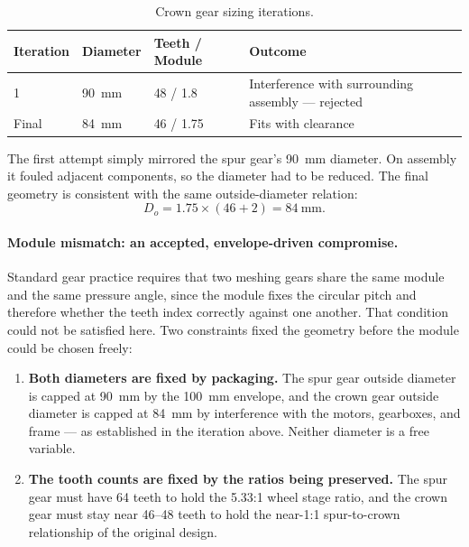 \documentclass[12pt,a4paper]{article}
\begin{document}
\begin{table}[htbp]
	\centering
	\caption{Crown gear sizing iterations.}
	\label{tab:crown-iter}
	\begin{tabular}{lllp{5.2cm}}
		\toprule
		\textbf{Iteration} & \textbf{Diameter} & \textbf{Teeth / Module} & \textbf{Outcome} \\
		\midrule
		1     & \SI{90}{\milli\metre} & 48 / \num{1.8}  & Interference with surrounding assembly --- rejected \\
		Final & \SI{84}{\milli\metre} & 46 / \num{1.75} & Fits with clearance \\
		\bottomrule
	\end{tabular}
\end{table}

The first attempt simply mirrored the spur gear's \SI{90}{\milli\metre}
diameter. On assembly it fouled adjacent components, so the diameter had to be
reduced. The final geometry is consistent with the same outside-diameter
relation:
\begin{equation}
	D_o = 1.75 \times (46 + 2) = \SI{84}{\milli\metre}.
\end{equation}

\paragraph{Module mismatch: an accepted, envelope-driven compromise.}
Standard gear practice requires that two meshing gears share the same module
and the same pressure angle, since the module fixes the circular pitch and
therefore whether the teeth index correctly against one another. That condition
could not be satisfied here. Two constraints fixed the geometry before the
module could be chosen freely:

\begin{enumerate}
	\item \textbf{Both diameters are fixed by packaging.} The spur gear outside
	      diameter is capped at \SI{90}{\milli\metre} by the
	      \SI{100}{\milli\metre} envelope, and the crown gear outside diameter
	      is capped at \SI{84}{\milli\metre} by interference with the motors,
	      gearboxes, and frame --- as established in the iteration above. Neither
	      diameter is a free variable.
	\item \textbf{The tooth counts are fixed by the ratios being preserved.} The
	      spur gear must have 64 teeth to hold the \num{5.33}:1 wheel stage
	      ratio, and the crown gear must stay near 46--48 teeth to hold the
	      near-1:1 spur-to-crown relationship of the original design.
\end{enumerate}
\end{document}
